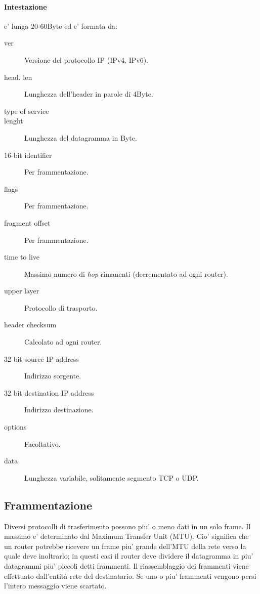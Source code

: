 \paragraph{Intestazione} e' lunga 20-60Byte ed e' formata da:
\begin{description}
    \item[ver] Versione del protocollo IP (IPv4, IPv6).
    \item[head. len] Lunghezza dell'header in parole di 4Byte.
    \item[type of service] 
    \item[lenght] Lunghezza del datagramma in Byte.
    \item[16-bit identifier] Per frammentazione.
    \item[flags] Per frammentazione.
    \item[fragment offset] Per frammentazione.
    \item[time to live] Massimo numero di \textit{hop} rimanenti (decrementato ad ogni router).
    \item[upper layer] Protocollo di trasporto.
    \item[header checksum] Calcolato ad ogni router.
    \item[32 bit source IP address] Indirizzo sorgente.
    \item[32 bit destination IP address] Indirizzo destinazione.
    \item[options] Facoltativo.
    \item[data] Lunghezza variabile, solitamente segmento TCP o UDP.
\end{description}
\subsection{Frammentazione}
Diversi protocolli di trasferimento possono piu' o meno dati in un solo frame. Il massimo e' determinato dal Maximum Transfer Unit (MTU).
Cio' significa che un router potrebbe ricevere un frame piu' grande dell'MTU della rete verso la quale deve inoltrarlo; in questi casi il router deve dividere il datagramma in piu' datagrammi piu' piccoli detti frammenti.
Il riassemblaggio dei frammenti viene effettuato dall'entità rete del destinatario.
Se uno o piu' frammenti vengono persi l'intero messaggio viene scartato.

